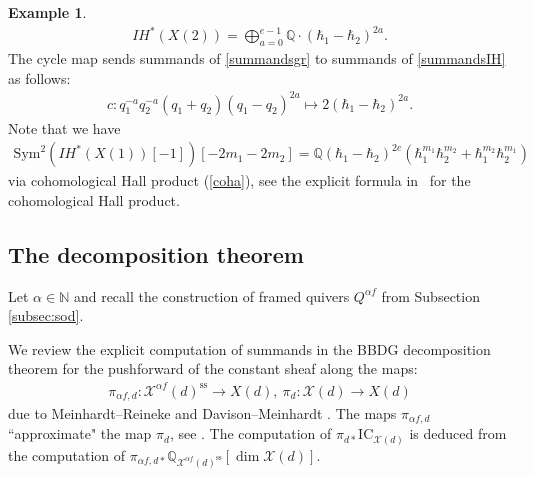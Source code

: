 \documentclass [11pt,oneside,a4paper,mathscr]{amsart}
\theoremstyle{definition}
\newtheorem{example}[thm]{Example}
\newcommand{\X}{\mathscr{X}}
\begin{document}
\begin{example}
\begin{align}
    I\!H^{\ast}(X(2))=\bigoplus_{a=0}^{e-1}\mathbb{Q} \cdot (\hbar_1-\hbar_2)^{2a}.
\end{align}
The cycle map sends summands of \eqref{summandsgr} to summands of \eqref{summandsIH} as follows:
\begin{align*}
     c\colon q_1^{-a}q_2^{-a}(q_1+q_2)(q_1-q_2)^{2a}
     \mapsto 2(\hbar_1-\hbar_2)^{2a}. 
\end{align*}
Note that we have 
\begin{align*}
\mathrm{Sym}^2(I\!H^{\ast}(X(1))[-1])[-2m_1-2m_2]=\mathbb{Q}(\hbar_1-\hbar_2)^{2e}(\hbar_1^{m_1}\hbar_2^{m_2}+\hbar_1^{m_2}\hbar_2^{m_1})
\end{align*}
via cohomological Hall product (\ref{coha}), see the explicit formula in~\cite[Theorem~2]{MR2851153} for the cohomological Hall product. 
\end{example}


\subsection{The decomposition theorem}\label{subsection:decompositiontheorem}





Let $\alpha\in\mathbb{N}$ and recall the construction of framed quivers $Q^{\alpha f}$ from Subsection \ref{subsec:sod}.

We review the explicit computation of summands in the BBDG decomposition theorem \cite{BBD} for the pushforward of the constant sheaf along the maps: 
\begin{align*}
    \pi_{\alpha f,d} \colon \X^{\alpha f}(d)^{\text{ss}}\to X(d),\
    \pi_d \colon \X(d)\to X(d)
\end{align*} due to Meinhardt--Reineke \cite{MeRe} and Davison--Meinhardt \cite{DM}.
The maps $\pi_{\alpha f,d}$ ``approximate" the map $\pi_d$, see \cite[Subsection 4.1]{DM}.
The computation of $\pi_{d*}\mathrm{IC}_{\X(d)}$ is deduced from the computation of $\pi_{\alpha f, d *}\mathbb{Q}_{\X^{\alpha f}(d)^{\mathrm{ss}}}[\dim \X(d)]$.
\end{document}
